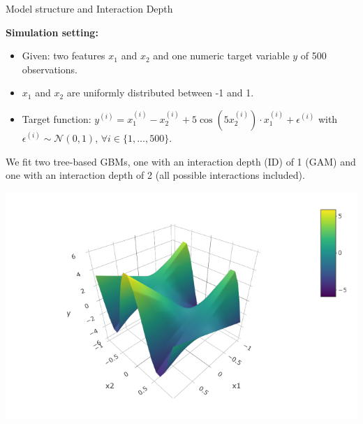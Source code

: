 \begin{vbframe}{Model structure and Interaction Depth}
\framebreak


\textbf{Simulation setting:}
\begin{itemize}
\item Given: two features $x_1$ and $x_2$ and one numeric target variable $y$ of 500 observations.
\item $x_1$ and $x_2$ are uniformly distributed between -1 and 1.
\item Target function: $y^{(i)} = x_1^{(i)} -  x_2^{(i)} + 5\cos(5 x_2^{(i)}) \cdot x_1^{(i)} + \epsilon^{(i)}$ with $\epsilon^{(i)} \sim \mathcal{N}(0, 1)$, $\forall i \in \{1, \dots, 500\}$.
\end{itemize}

\vfill

\begin{minipage}[c]{0.5\textwidth}
  We fit two tree-based GBMs, one with an interaction depth (ID) of 1 (GAM) and
  one with an interaction depth of 2 (all possible interactions included).
\end{minipage}%
\begin{minipage}[c]{0.5\textwidth}
  \centering
  \includegraphics[width=\textwidth]{
  figure_man/boosting_interaction_targetfunction3D.PNG}
\end{minipage}%

\framebreak


\end{vbframe}

